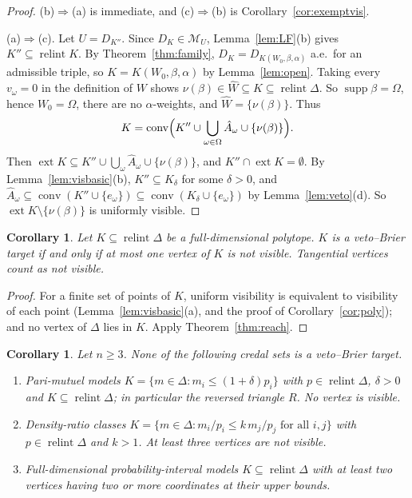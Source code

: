 \documentclass[11pt]{article}
\newcommand{\M}{\mathcal{M}}
\DeclareMathOperator{\conv}{conv}
\DeclareMathOperator{\relint}{relint}
\DeclareMathOperator{\supp}{supp}
\DeclareMathOperator{\ext}{ext}
\theoremstyle{plain}
\newtheorem{corollary}[theorem]{Corollary}
\theoremstyle{definition}
\theoremstyle{remark}
\begin{document}
\begin{proof}
(b)$\Rightarrow$(a) is immediate, and (c)$\Rightarrow$(b) is
Corollary~\ref{cor:exemptvis}.

(a)$\Rightarrow$(c). Let $U=D_{K''}$. Since $D_K\in\M_U$, Lemma~\ref{lem:LF}(b) gives
$K''\subseteq\relint K$. By Theorem~\ref{thm:family}, $D_K=D_{K(W_0,\beta,\alpha)}$ a.e.\
for an admissible triple, so $K=K(W_0,\beta,\alpha)$ by Lemma~\ref{lem:open}. Taking every
$v_\omega=0$ in the definition of $W$ shows $\nu(\beta)\in\hat W\subseteq K\subseteq
\relint\Delta$. So $\supp\beta=\Omega$, hence $W_0=\Omega$, there are no
$\alpha$-weights, and $\hat W=\{\nu(\beta)\}$. Thus
\[
  K=\conv\Bigl(K''\cup\bigcup_{\omega\in\Omega}\hat A_\omega\cup\{\nu(\beta)\}\Bigr).
\]
Then $\ext K\subseteq K''\cup\bigcup_\omega\hat A_\omega\cup\{\nu(\beta)\}$, and
$K''\cap\ext K=\emptyset$. By Lemma~\ref{lem:visbasic}(b), $K''\subseteq K_\delta$ for some
$\delta>0$, and $\hat A_\omega\subseteq\conv(K''\cup\{e_\omega\})\subseteq\conv(K_\delta
\cup\{e_\omega\})$ by Lemma~\ref{lem:veto}(d). So $\ext K\setminus\{\nu(\beta)\}$ is
uniformly visible.
\end{proof}

\begin{corollary}\label{cor:polyreach}
Let $K\subseteq\relint\Delta$ be a full-dimensional polytope. $K$ is a veto--Brier target
if and only if at most one vertex of $K$ is not visible. Tangential vertices count as not
visible.
\end{corollary}

\begin{proof}
For a finite set of points of $K$, uniform visibility is equivalent to visibility of each
point (Lemma~\ref{lem:visbasic}(a), and the proof of Corollary~\ref{cor:poly}); and no
vertex of $\Delta$ lies in $K$. Apply Theorem~\ref{thm:reach}.
\end{proof}

\begin{corollary}\label{cor:out}
Let $n\ge3$. None of the following credal sets is a veto--Brier target.
\begin{enumerate}[label=(\alph*)]
  \item \emph{Pari-mutuel models} $K=\{m\in\Delta:m_i\le(1+\delta)p_i\}$ with
  $p\in\relint\Delta$, $\delta>0$ and $K\subseteq\relint\Delta$; in particular the reversed
  triangle $R$. No vertex is visible.
  \item \emph{Density-ratio classes} $K=\{m\in\Delta:m_i/p_i\le k\,m_j/p_j\text{ for all
  }i,j\}$ with $p\in\relint\Delta$ and $k>1$. At least three vertices are not visible.
  \item Full-dimensional probability-interval models $K\subseteq\relint\Delta$ with at
  least two vertices having two or more coordinates at their upper bounds.
\end{enumerate}
\end{corollary}
\end{document}
